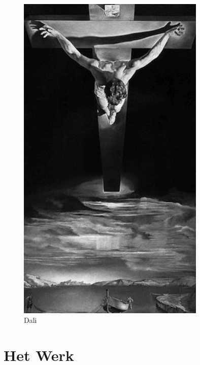 \documentclass[10pt,twoside, openright]{memoir}
\begin{document}
\begin{figure}
\centering
\includegraphics[width=0.8\textwidth]{img/190dali.jpg}
\caption*{\footnotesize Dali}
\end{figure}


\chapter{Het Werk}
\end{document}
